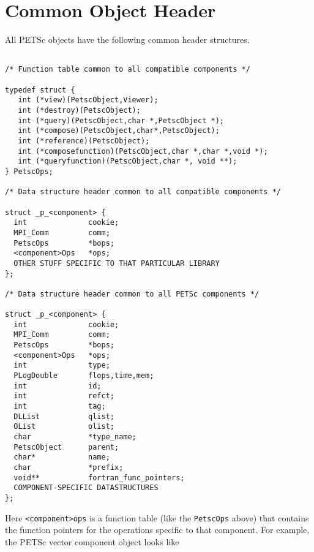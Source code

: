 \section{Common Object Header}

All PETSc objects have the following common header structures.

\begin{verbatim}

/* Function table common to all compatible components */

typedef struct {
   int (*view)(PetscObject,Viewer);
   int (*destroy)(PetscObject);
   int (*query)(PetscObject,char *,PetscObject *);
   int (*compose)(PetscObject,char*,PetscObject);
   int (*reference)(PetscObject);
   int (*composefunction)(PetscObject,char *,char *,void *);
   int (*queryfunction)(PetscObject,char *, void **);
} PetscOps;

/* Data structure header common to all compatible components */

struct _p_<component> {
  int              cookie;                                  
  MPI_Comm         comm;                                    
  PetscOps         *bops;                                   
  <component>Ops   *ops;       
  OTHER STUFF SPECIFIC TO THAT PARTICULAR LIBRARY
};

/* Data structure header common to all PETSc components */

struct _p_<component> {
  int              cookie;                                  
  MPI_Comm         comm;                                    
  PetscOps         *bops;                                   
  <component>Ops   *ops;                                    
  int              type;                                    
  PLogDouble       flops,time,mem;                          
  int              id;                                      
  int              refct;                                   
  int              tag;                                     
  DLList           qlist;                                   
  OList            olist;                                   
  char             *type_name;                              
  PetscObject      parent;                                  
  char*            name;                                    
  char             *prefix;                                 
  void**           fortran_func_pointers;       
  COMPONENT-SPECIFIC DATASTRUCTURES
}; 

\end{verbatim}
Here {\tt <component>ops} is a function table (like the {\tt PetscOps} above) that 
contains the function pointers for the operations specific to that component.
For example, the PETSc vector component object looks like

